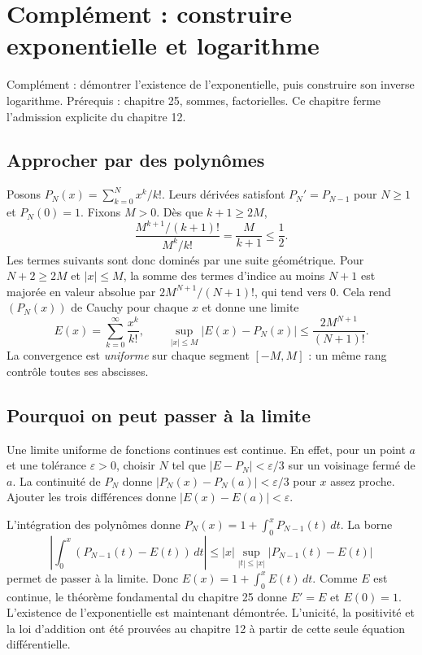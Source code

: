 \documentclass[../cours_1re.tex]{subfiles}
\begin{document}
\setcounter{chapter}{25}
\chapter{Complément : construire exponentielle et logarithme}
\label{ch:26}
\begin{objectif}
Complément : démontrer l'existence de l'exponentielle, puis construire son inverse logarithme.
Prérequis : chapitre 25, sommes, factorielles. Ce chapitre ferme l'admission explicite du chapitre 12.
\end{objectif}
\section{Approcher par des polynômes}
Posons $P_N(x)=\sum_{k=0}^N x^k/k!$.
Leurs dérivées satisfont $P_N'=P_{N-1}$ pour $N\ge1$ et $P_N(0)=1$.
Fixons $M>0$. Dès que $k+1\ge2M$,
\[
\frac{M^{k+1}/(k+1)!}{M^k/k!}=\frac M{k+1}\le\frac12.
\]
Les termes suivants sont donc dominés par une suite géométrique.
Pour $N+2\ge2M$ et $|x|\le M$, la somme des termes d'indice au moins $N+1$
est majorée en valeur absolue par
$2M^{N+1}/(N+1)!$, qui tend vers $0$.
Cela rend $(P_N(x))$ de Cauchy pour chaque $x$ et donne une limite
\[
E(x)=\sum_{k=0}^{\infty}\frac{x^k}{k!},
\qquad
\sup_{|x|\le M}|E(x)-P_N(x)|\le\frac{2M^{N+1}}{(N+1)!}.
\]
La convergence est \emph{uniforme} sur chaque segment $[-M,M]$ :
un même rang contrôle toutes ses abscisses.

\section{Pourquoi on peut passer à la limite}
Une limite uniforme de fonctions continues est continue.
En effet, pour un point $a$ et une tolérance $\varepsilon>0$, choisir $N$
tel que $|E-P_N|<\varepsilon/3$ sur un voisinage fermé de $a$.
La continuité de $P_N$ donne $|P_N(x)-P_N(a)|<\varepsilon/3$ pour $x$
assez proche. Ajouter les trois différences donne $|E(x)-E(a)|<\varepsilon$.

L'intégration des polynômes donne
$P_N(x)=1+\int_0^xP_{N-1}(t)\,dt$.
La borne
\[
\left|\int_0^x(P_{N-1}(t)-E(t))\,dt\right|
\le |x|\sup_{|t|\le |x|}|P_{N-1}(t)-E(t)|
\]
permet de passer à la limite. Donc $E(x)=1+\int_0^xE(t)\,dt$.
Comme $E$ est continue, le théorème fondamental du chapitre 25 donne
$E'=E$ et $E(0)=1$.
L'existence de l'exponentielle est maintenant démontrée. L'unicité,
la positivité et la loi d'addition ont été prouvées au chapitre 12 à partir
de cette seule équation différentielle.
\end{document}

